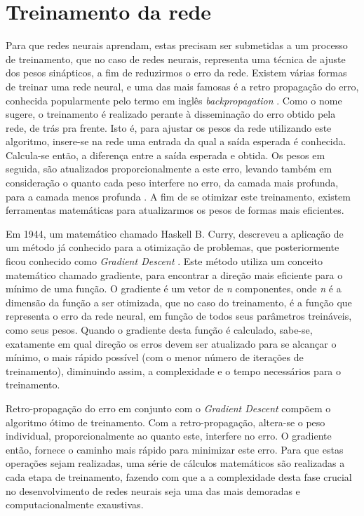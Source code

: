 \section{Treinamento da rede}
\label{sec:train}

Para que redes neurais aprendam, estas precisam ser submetidas a um processo de treinamento, que no caso de redes neurais, representa uma técnica de ajuste dos pesos sinápticos, a fim de reduzirmos o erro da rede. Existem várias formas de treinar uma rede neural, e uma das mais famosas é a retro propagação do erro, conhecida popularmente pelo termo em inglês \textit{backpropagation} \cite{rumelhart_learning_1986}. Como o nome sugere, o treinamento é realizado perante à disseminação do erro obtido pela rede, de trás pra frente. Isto é, para ajustar os pesos da rede utilizando este algoritmo, insere-se na rede uma entrada da qual a saída esperada é conhecida. Calcula-se então, a diferença entre a saída esperada e obtida. Os pesos em seguida, são atualizados proporcionalmente a este erro, levando também em consideração o quanto cada peso interfere no erro, da camada mais profunda, para a camada menos profunda \cite{rumelhart_learning_1986}. A fim de se otimizar este treinamento, existem ferramentas matemáticas para atualizarmos os pesos de formas mais eficientes.

Em 1944, um matemático chamado Haskell B. Curry, descreveu a aplicação de um método já conhecido para a otimização de problemas, que posteriormente ficou conhecido como \textit{Gradient Descent} \cite{curry_method_1944}. Este método utiliza um conceito matemático chamado gradiente, para encontrar a direção mais eficiente para o mínimo de uma função. O gradiente é um vetor de \textit{n} componentes, onde \textit{n} é a dimensão da função a ser otimizada, que no caso do treinamento, é a função que representa o erro da rede neural, em função de todos seus parâmetros treináveis, como seus pesos. Quando o gradiente desta função é calculado, sabe-se, exatamente em qual direção os erros devem ser atualizado para se alcançar o mínimo, o mais rápido possível (com o menor número de iterações de treinamento), diminuindo assim, a complexidade e o tempo necessários para o treinamento.

Retro-propagação do erro em conjunto com o \textit{Gradient Descent} compõem o algoritmo ótimo de treinamento. Com a retro-propagação, altera-se o peso individual, proporcionalmente ao quanto este, interfere no erro. O gradiente então, fornece o caminho mais rápido para minimizar este erro. Para que estas operações sejam realizadas, uma série de cálculos matemáticos são realizadas a cada etapa de treinamento, fazendo com que a a complexidade desta fase crucial no desenvolvimento de redes neurais seja uma das mais demoradas e computacionalmente exaustivas.

